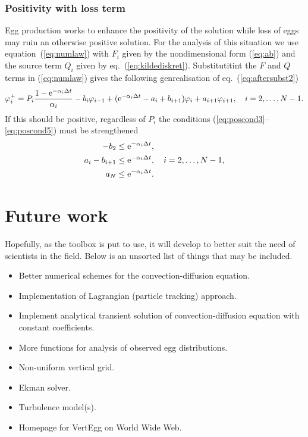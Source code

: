 \subsection{Positivity with loss term}\label{app:posloss}

Egg production works to enhance the positivity of the solution
while loss of eggs may ruin an otherwise positive solution.
For the analysis of this situation we use equation~(\ref{eq:numlaw})
with $F_i$ given by the nondimensional form (\ref{eq:ab}) and the
source term $Q_i$ given by eq.~(\ref{eq:kildediskret}).
Substitutitint the $F$ and $Q$ terms in (\ref{eq:numlaw}) gives the
following genrealisation of eq.~(\ref{eq:aftersubst2})
\begin{equation}
  \varphi_i^+  = P_i \frac{1-\mathrm{e}^{-\alpha_i \Delta t}}{\alpha_i}
          - b_i \varphi_{i-1} + (\mathrm{e}^{-\alpha_i \Delta t} - a_i + b_{i+1}) \varphi_i 
             + a_{i+1} \varphi_{i+1} , \quad i = 2, \dots, N-1 .
\end{equation}
If this should be positive, regardless of $P_i$ the  conditions
(\ref{eq:poscond3}--\ref{eq:poscond5}) must be strengthened
\begin{align}
   - b_2 & \le \mathrm{e}^{-\alpha_i \Delta t}, \\ 
   a_i - b_{i+1} & \le \mathrm{e}^{-\alpha_i \Delta t}, \quad i = 2, \dots, N-1, \\
   a_N           & \le \mathrm{e}^{-\alpha_i \Delta t} . 
\end{align}






\chapter{Future work}

Hopefully, as the toolbox is put to use, it will develop to better
suit the need of scientists in the field. Below is an unsorted list
of things that may be included.

\begin{itemize}
  \item Better numerical schemes for the convection-diffusion equation.
  \item Implementation of Lagrangian (particle tracking) approach.
  \item Implement analytical transient solution of
        convection-diffusion equation with constant coefficients.
  \item More functions for analysis of observed egg distributions.
  \item Non-uniform vertical grid.
  \item Ekman solver.
  \item Turbulence model(s).
  \item Homepage for VertEgg on World Wide Web.
\end{itemize}

